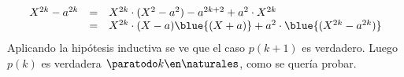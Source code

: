 \begin{enumerate}[label=\roman*)]
        $$
          \begin{array}{rcl}
            X^{2k} - a^{2k} & = & X^{2k}\cdot(X^2 - a^2) - a^{2k + 2} + a^2 \cdot X^{2k}                \\
                            & = & X^{2k}\cdot(X - a)\blue{(X + a)} + a^2 \cdot \blue{(X^{2k} - a^{2k})}
          \end{array}
        $$
        Aplicando la hipótesis inductiva se ve que el caso $p(k+1)$ es verdadero. Luego
        $p(k)$ es verdadera $\paratodo k \en \naturales$, como se quería probar.
\end{enumerate}

\begin{aportes}
  \item {}
  \item {}
\end{aportes}
